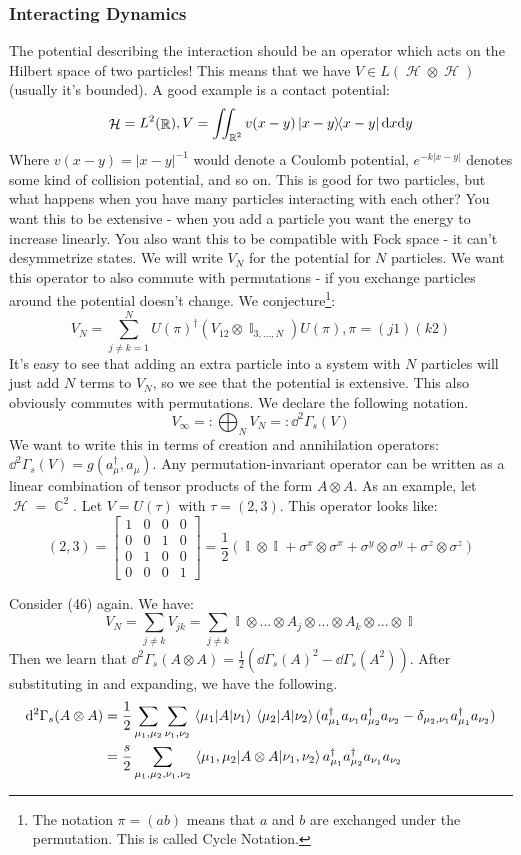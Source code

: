 \documentclass{article}
\DeclareMathOperator{\Hh}{{\mathcal{H}}}
\DeclareMathOperator{\RR}{\mathbb{R}}
\DeclareMathOperator{\II}{\mathbb{I}}
\DeclareMathOperator{\CC}{\mathbb{C}}
\begin{document}
\subsubsection{Interacting Dynamics}
The potential describing the interaction should be an operator which acts on the Hilbert space of two particles! This means that we have $V \in L(\Hh\otimes \Hh)$ (usually it's bounded). A good example is a contact potential:
\[\Hh = L^2(\RR), V = \iint_{\RR^2} v(x-y)\dyad{x-y}\dd x \dd y\]
Where $v(x-y) = |x-y|^{-1}$ would denote a Coulomb potential, $e^{-k|x-y|}$ denotes some kind of collision potential, and so on. This is good for two particles, but what happens when you have many particles interacting with each other? You want this to be extensive - when you add a particle you want the energy to increase linearly. You also want this to be compatible with Fock space - it can't desymmetrize states. We will write $V_N$ for the potential for $N$ particles. We want this operator to also commute with permutations - if you exchange particles around the potential doesn't change. We conjecture\footnote{The notation $\pi=(a b)$ means that $a$ and $b$ are exchanged under the permutation. This is called Cycle Notation.}:
\begin{equation}
V_N = \sum_{j\neq k = 1}^N U(\pi)^\dagger \left(V_{12} \otimes \II_{3,...,N}\right) U(\pi), \pi=(j 1)(k 2)
\end{equation}
It's easy to see that adding an extra particle into a system with $N$ particles will just add $N$ terms to $V_N$, so we see that the potential is extensive. This also obviously commutes with permutations. We declare the following notation.
\[V_\infty =: \bigoplus_N V_N =: \dd^2 \Gamma_s(V)\]
We want to write this in terms of creation and annihilation operators: $\dd^2\Gamma_s(V) = g(a_\mu^\dagger,a_\mu)$. Any permutation-invariant operator can be written as a linear combination of tensor products of the form $A \otimes A$. As an example, let $\Hh = \CC^2$. Let $V = U(\tau)$ with $\tau = (2,3)$. This operator looks like:
\[(2,3) = \begin{bmatrix}1&0&0&0\\0&0&1&0\\0&1&0&0\\0&0&0&1\end{bmatrix}= \frac{1}{2}\left(\II\otimes \II + \sigma^x\otimes\sigma^x + \sigma^y\otimes\sigma^y + \sigma^z\otimes \sigma^z\right)\]

Consider (46) again. We have:
\[V_N = \sum_{j\neq k}V_{jk} = \sum_{j\neq k}\II\otimes...\otimes A_j\otimes ... \otimes A_k\otimes ... \otimes \II\]
 Then we learn that $\dd^2\Gamma_s(A\otimes A) = \frac{1}{2}(\dd\Gamma_s(A)^2-\dd\Gamma_s(A^2))$. After substituting in and expanding, we have the following.
\begin{align}
\dd^2\Gamma_s(A\otimes A) &= \frac{1}{2}\sum_{\mu_1,\mu_2}\sum_{\nu_1,\nu_2}\mel{\mu_1}{A}{\nu_1}\mel{\mu_2}{A}{\nu_2}(a_{\mu_1}^\dagger a_{\nu_1} a_{\mu_2}^\dagger a_{\nu_2} - \delta_{\mu_2,\nu_1}a^\dagger_{\mu_1} a_{\nu_2})\\
&= \frac{s}{2}\sum_{\mu_1,\mu_2,\nu_1,\nu_2}\mel{\mu_1,\mu_2}{A\otimes A}{\nu_1,\nu_2} a_{\mu_1}^\dagger a_{\mu_2}^\dagger a_{\nu_1} a_{\nu_2}
\end{align}
\end{document}
